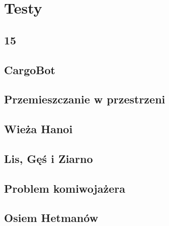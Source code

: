 \chapter{Testy}
\thispagestyle{chapterBeginStyle}

\section{15}

\section{CargoBot}

\section{Przemieszczanie w przestrzeni}

\section{Wieża Hanoi}

\section{Lis, Gęś i Ziarno}

\section{Problem komiwojażera}

\section{Osiem Hetmanów}